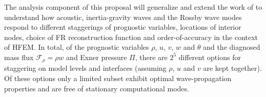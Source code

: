 \documentclass[11pt]{article}
\begin{document}
The analysis component of this proposal will generalize and extend the work of \cite{JTTJW2005JCP} to understand how acoustic, inertia-gravity waves and the Rossby wave modes respond to different staggerings of prognostic variables, locations of interior nodes, choice of FR reconstruction function and order-of-accuracy in the context of HFEM.  In total, of the prognostic variables $\rho$, $u$, $v$, $w$ and $\theta$ and the diagnosed mass flux $\mathcal{F}_\rho = \rho w$ and Exner pressure $\Pi$, there are $2^5$ different options for staggering on model levels and interfaces (assuming $\rho$, $u$ and $v$ are kept together).  Of these options only a limited subset exhibit optimal wave-propagation properties and are free of stationary computational modes.


\end{document}

